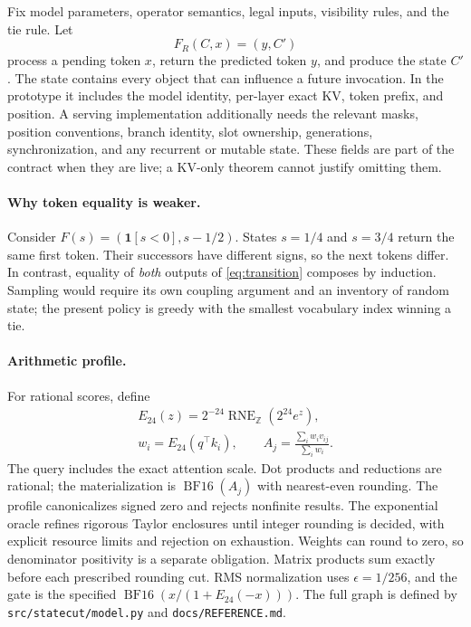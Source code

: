 \documentclass{article}
\theoremstyle{plain}
\theoremstyle{definition}
\theoremstyle{remark}
\newcommand{\BF}{\operatorname{BF16}}
\newcommand{\RNE}{\operatorname{RNE}}
\newcommand{\E}{E_{24}}
\newcommand{\code}[1]{\texttt{\small #1}}
\begin{document}
Fix model parameters, operator semantics, legal inputs, visibility rules, and
the tie rule. Let
\begin{equation}
 F_R(C,x)=(y,C')
 \label{eq:transition}
\end{equation}
process a pending token $x$, return the predicted token $y$, and produce the
state $C'$. The state contains every object that can influence a future
invocation. In the prototype it includes the model identity, per-layer exact
KV, token prefix, and position. A serving implementation additionally needs
the relevant masks, position conventions, branch identity, slot ownership,
generations, synchronization, and any recurrent or mutable state. These
fields are part of the contract when they are live; a KV-only theorem cannot
justify omitting them.

\paragraph{Why token equality is weaker.}
Consider $F(s)=(\mathbf 1[s<0],s-1/2)$. States $s=1/4$ and $s=3/4$ return
the same first token. Their successors have different signs, so the next
tokens differ. In contrast, equality of \emph{both} outputs of
\cref{eq:transition} composes by induction. Sampling would require its own
coupling argument and an inventory of random state; the present policy is
greedy with the smallest vocabulary index winning a tie.

\paragraph{Arithmetic profile.}
For rational scores, define
\begin{equation}
 \begin{gathered}
 \E(z)=2^{-24}\RNE_{\mathbb Z}(2^{24}e^z),\\
 w_i=\E(q^\top k_i),\qquad
 A_j=\frac{\sum_i w_i v_{ij}}{\sum_i w_i}.
 \end{gathered}
 \label{eq:profile}
\end{equation}
The query includes the exact attention scale. Dot products and reductions
are rational; the materialization is $\BF(A_j)$ with nearest-even rounding.
The profile canonicalizes signed zero and rejects nonfinite results. The
exponential oracle refines rigorous Taylor enclosures until integer rounding
is decided, with explicit resource limits and rejection on exhaustion.
Weights can round to zero, so denominator positivity is a separate
obligation. Matrix products sum exactly before each prescribed rounding cut.
RMS normalization uses $\epsilon=1/256$, and the gate is the specified
$\BF(x/(1+\E(-x)))$. The full graph is defined by
\code{src/statecut/model.py} and \code{docs/REFERENCE.md}.
\end{document}
